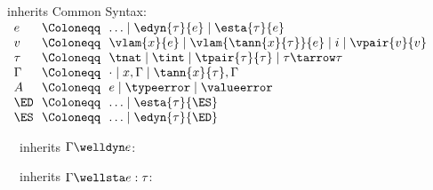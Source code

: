 \begin{flushleft}

 inherits Common Syntax:\\
$\begin{array}{l@{~~}c@{~~}l}
  e & \Coloneqq & \ldots \mid \edyn{\tau}{e} \mid \esta{\tau}{e}
\\
  v & \Coloneqq & \vlam{x}{e} \mid \vlam{\tann{x}{\tau}}{e} \mid i \mid \vpair{v}{v}
\\
  \tau & \Coloneqq & \tnat \mid \tint \mid \tpair{\tau}{\tau} \mid \tau \tarrow \tau
\\
  \Gamma & \Coloneqq & \cdot \mid x,\Gamma \mid \tann{x}{\tau},\Gamma
\\
  A & \Coloneqq & e \mid \typeerror \mid \valueerror
\\
  \ED & \Coloneqq & \ldots \mid \esta{\tau}{\ES}
\\
  \ES & \Coloneqq & \ldots \mid \edyn{\tau}{\ED}
\end{array}$

\medskip
\begin{minipage}[t]{0.5\columnwidth}
~~inherits $\Gamma \welldyn e$:\\
\begin{mathpar}
\end{mathpar}
\end{minipage}%
\begin{minipage}[t]{0.5\columnwidth}
~~inherits $\Gamma \wellsta e : \tau$:\\
\begin{mathpar}

\end{mathpar}
\end{minipage}
\end{flushleft}

